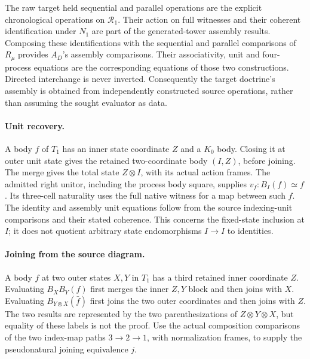 \documentclass{article}
\begin{document}
The raw target held sequential and parallel operations are the explicit chronological operations on $\mathcal R_1$. Their action on full witnesses and their coherent identification under $N_1$ are part of the generated-tower assembly results. Composing these identifications with the sequential and parallel comparisons of $R_\mu$ provides $A_D$'s assembly comparisons. Their associativity, unit and four-process equations are the corresponding equations of those two constructions. Directed interchange is never inverted. Consequently the target doctrine's assembly is obtained from independently constructed source operations, rather than assuming the sought evaluator as data.

\paragraph{Unit recovery.} A body $f$ of $T_1$ has an inner state coordinate $Z$ and a $K_0$ body. Closing it at outer unit state gives the retained two-coordinate body $(I,Z)$, before joining. The merge gives the total state $Z\otimes I$, with its actual action frames. The admitted right unitor, including the process body square, supplies $v_f:B_I(f)\simeq f$. Its three-cell naturality uses the full native witness for a map between such $f$. The identity and assembly unit equations follow from the source indexing-unit comparisons and their stated coherence. This concerns the fixed-state inclusion at $I$; it does not quotient arbitrary state endomorphisms $I\to I$ to identities.

\paragraph{Joining from the source diagram.} A body $f$ at two outer states $X,Y$ in $T_1$ has a third retained inner coordinate $Z$. Evaluating $B_XB_Y(f)$ first merges the inner $Z,Y$ block and then joins with $X$. Evaluating $B_{Y\otimes X}(\bar f)$ first joins the two outer coordinates and then joins with $Z$. The two results are represented by the two parenthesizations of $Z\otimes Y\otimes X$, but equality of these labels is not the proof. Use the actual composition comparisons of the two index-map paths $3\to2\to1$, with normalization frames, to supply the pseudonatural joining equivalence $j$.
\end{document}
